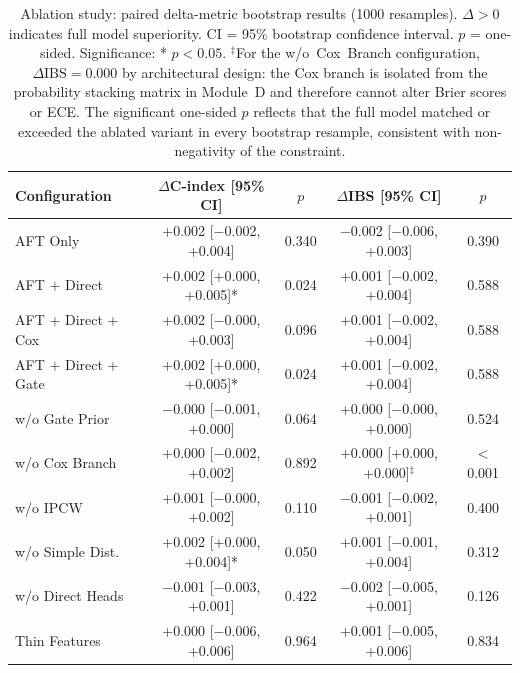 \documentclass[fire,article,submit,pdftex]{../Definitions/mdpi}
\begin{document}
\begin{table}[!ht]
\caption{Ablation study: paired delta-metric bootstrap results (1000 resamples). $\Delta > 0$ indicates full model superiority. CI = 95\% bootstrap confidence interval. $p$ = one-sided. Significance: * $p < 0.05$. $^\ddagger$For the w/o~Cox~Branch configuration, $\Delta\text{IBS} = 0.000$ by architectural design: the Cox branch is isolated from the probability stacking matrix in Module~D and therefore cannot alter Brier scores or ECE. The significant one-sided $p$ reflects that the full model matched or exceeded the ablated variant in every bootstrap resample, consistent with non-negativity of the constraint.}\label{tab:ablation}
\small
\begin{tabular}{lcccc}
\toprule
\textbf{Configuration} & \textbf{$\Delta$C-index [95\% CI]} & \textbf{$p$} & \textbf{$\Delta$IBS [95\% CI]} & \textbf{$p$} \\
\midrule
AFT Only           & +0.002 [$-$0.002, +0.004] & 0.340 & $-$0.002 [$-$0.006, +0.003] & 0.390 \\
AFT + Direct       & +0.002 [+0.000, +0.005]* & 0.024 & +0.001 [$-$0.002, +0.004] & 0.588 \\
AFT + Direct + Cox & +0.002 [$-$0.000, +0.003] & 0.096 & +0.001 [$-$0.002, +0.004] & 0.588 \\
AFT + Direct + Gate & +0.002 [+0.000, +0.005]* & 0.024 & +0.001 [$-$0.002, +0.004] & 0.588 \\
w/o Gate Prior     & $-$0.000 [$-$0.001, +0.000] & 0.064 & +0.000 [$-$0.000, +0.000] & 0.524 \\
w/o Cox Branch     & +0.000 [$-$0.002, +0.002] & 0.892 & +0.000 [+0.000, +0.000]$^\ddagger$ & $<$0.001 \\
w/o IPCW           & +0.001 [$-$0.000, +0.002] & 0.110 & $-$0.001 [$-$0.002, +0.001] & 0.400 \\
w/o Simple Dist.   & +0.002 [+0.000, +0.004]* & 0.050 & +0.001 [$-$0.001, +0.004] & 0.312 \\
w/o Direct Heads   & $-$0.001 [$-$0.003, +0.001] & 0.422 & $-$0.002 [$-$0.005, +0.001] & 0.126 \\
Thin Features      & +0.000 [$-$0.006, +0.006] & 0.964 & +0.001 [$-$0.005, +0.006] & 0.834 \\
\bottomrule
\end{tabular}
\end{table}
\end{document}
